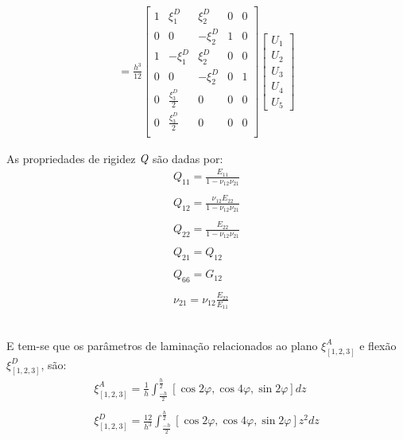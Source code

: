 \begin{equation}
\begin{gathered}
= \frac{h^3}{12}
\begin{bmatrix}
		1 & \xi^D_1 & \xi^D_2 & 0 & 0 \\
		0 & 0 & -\xi^D_2 & 1 & 0 \\
    1 & -\xi^D_1 & \xi^D_2 & 0 & 0 \\
		0 & 0 & -\xi^D_2 & 0 & 1 \\
		0 & \frac{\xi^D_3}{2} & 0 & 0 & 0 \\
		0 & \frac{\xi^D_3}{2} & 0 & 0 & 0 \\
\end{bmatrix}
\begin{bmatrix}
    U_1\\  U_2 \\ U_3 \\ U_4 \\ U_5
\end{bmatrix}
\end{gathered}
\end{equation}

As propriedades de rigidez $\emph{Q}$ são dadas por:
\begin{equation} \label{Q_properties}
\begin{gathered}
Q_{11}=\frac{E_{11}}{1-\nu_{12}\nu_{21}}\\~\\
Q_{12}=\frac{\nu_{12}E_{22}}{1-\nu_{12}\nu_{21}}\\~\\
Q_{22}=\frac{E_{22}}{1-\nu_{12}\nu_{21}}\\~\\
Q_{21}=Q_{12}\\~\\
Q_{66}=G_{12}\\~\\
\nu_{21}=\nu_{12}\frac{E_{22}}{E_{11}}
\end{gathered}
\end{equation}\

E tem-se que os parâmetros de laminação relacionados ao plano $\xi^A_{[1, 2, 3]}$ e flexão $\xi^D_{[1, 2, 3]}$, são:
\begin{equation}\label{qsiA}
\begin{gathered}
	\xi^A_{[1, 2, 3]} = \frac{1}{h}\int^{\frac{h}{2}}_{\frac{-h}{2}}[\cos2\varphi, \cos4\varphi, \sin2\varphi]dz\\~\\
	\xi^D_{[1, 2, 3]} = \frac{12}{h^3}\int^{\frac{h}{2}}_{\frac{-h}{2}}[\cos2\varphi, \cos4\varphi, \sin2\varphi]z^2dz
\end{gathered}
\end{equation}\

